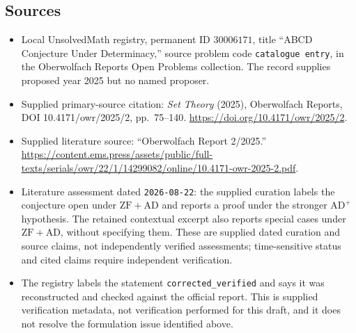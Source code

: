 \documentclass[11pt]{article}
\begin{document}
\subsection{Sources}
\begin{itemize}
\item Local UnsolvedMath registry, permanent ID \(30006171\), title ``ABCD Conjecture Under Determinacy,'' source problem code \texttt{catalogue entry}, in the Oberwolfach Reports Open Problems collection. The record supplies proposed year 2025 but no named proposer.
\item Supplied primary-source citation: \emph{Set Theory} (2025), Oberwolfach Reports, DOI 10.4171/owr/2025/2, pp.~75--140. \url{https://doi.org/10.4171/owr/2025/2}.
\item Supplied literature source: ``Oberwolfach Report 2/2025.'' \url{https://content.ems.press/assets/public/full-texts/serials/owr/22/1/14299082/online/10.4171-owr-2025-2.pdf}.
\item Literature assessment dated \texttt{2026-08-22}: the supplied curation labels the conjecture open under \(\mathrm{ZF}+\mathrm{AD}\) and reports a proof under the stronger \(\mathrm{AD}^{+}\) hypothesis. The retained contextual excerpt also reports special cases under \(\mathrm{ZF}+\mathrm{AD}\), without specifying them. These are supplied dated curation and source claims, not independently verified assessments; time-sensitive status and cited claims require independent verification.
\item The registry labels the statement \texttt{corrected\_verified} and says it was reconstructed and checked against the official report. This is supplied verification metadata, not verification performed for this draft, and it does not resolve the formulation issue identified above.
\end{itemize}
\end{document}

